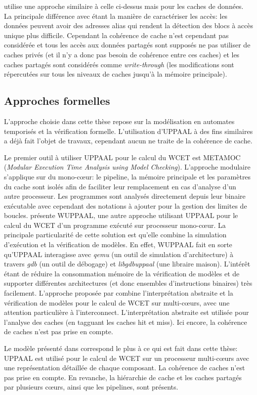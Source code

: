 \cite{lesage:inria-00531214} utilise une approche similaire à
celle ci-dessus mais pour les caches de données.
La principale
différence avec  \cite{10.1109/RTSS.2009.34} étant la manière de caractériser les accès:
les données peuvent avoir des adresses alias qui rendent la détection des
blocs à accès unique plus difficile.
Cependant la cohérence de cache n'est cependant pas considérée
et tous les accès aux données partagés sont supposés ne pas utiliser de caches privés (et il n'y a donc pas besoin de cohérence entre ces caches) et les caches partagés sont considérés comme \textit{write-through} (les modifications sont répercutées sur tous les niveaux de caches jusqu'à la mémoire principale). 

\subsection{Approches formelles}
\label{fr:sec:rel_formal}
L'approche choisie dans cette thèse repose sur la modélisation en automates temporisés et la vérification formelle.
L'utilisation d'UPPAAL à des fins similaires a déjà
fait l'objet de travaux, cependant aucun ne traite de la cohérence de cache.

Le premier outil à utiliser UPPAAL pour le calcul du WCET
est METAMOC \cite{dalsgaard_et_al:OASIcs:2010:2831}
(\textit{Modular Execution Time Analysis using Model Checking}). L'approche
modulaire s'applique sur du mono-c\oe ur:
le pipeline, la mémoire principale et les paramètres du cache sont isolés afin
de faciliter leur remplacement en cas d'analyse d'un autre processeur. Les
programmes sont analysés directement depuis leur binaire exécutable avec
cependant des notations à ajouter pour la gestion des limites de boucles.
\cite{wuppaal} présente WUPPAAL, une autre approche utilisant UPPAAL pour le
calcul du WCET d'un programme exécuté sur processeur mono-cœur. La principale
particularité de cette solution est qu'elle combine la simulation d'exécution
et la vérification de modèles. En effet, WUPPAAL fait en sorte qu'UPPAAL
interagisse avec 
\textit{qemu} (un outil de simulation d'architecture)
à travers \textit{gdb} (un outil de débogage) et
\textit{libgdbuppaal} (une libraire maison). L'intérêt étant de réduire la
consommation mémoire de la vérification de modèles et de supporter différentes
architectures (et donc ensembles d'instructions binaires) très facilement.
L'approche proposée par \cite{5702243} combine l'interprétation abstraite et la
vérification de modèles pour le calcul de WCET sur multi-cœurs, avec une
attention particulière à l'interconnect. L'interprétation abstraite est
utilisée pour l'analyse des caches (en tagguant les caches hit et miss).
Ici encore, la cohérence de caches n'est pas prise en compte. 

Le modèle présenté dans \cite{conf/wcet/GustavssonELP10} correspond le plus
à ce qui est fait dans cette thèse: UPPAAL est
utilisé pour le calcul de WCET sur un processeur multi-cœurs avec une
représentation détaillée de chaque composant. La cohérence de caches n'est pas
prise en compte. En revanche, la hiérarchie de cache et les caches partagés par
plusieurs cœurs, ainsi que les pipelines, sont présents. 

